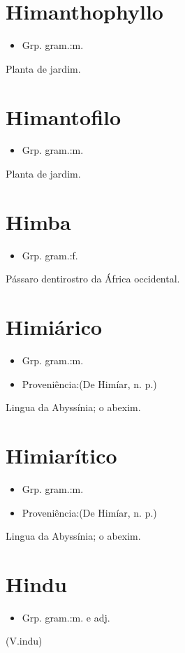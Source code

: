 \documentclass{article}
\begin{document}
\section{Himanthophyllo}
\begin{itemize}
\item {Grp. gram.:m.}
\end{itemize}
Planta de jardim.
\section{Himantofilo}
\begin{itemize}
\item {Grp. gram.:m.}
\end{itemize}
Planta de jardim.
\section{Himba}
\begin{itemize}
\item {Grp. gram.:f.}
\end{itemize}
Pássaro dentirostro da África occidental.
\section{Himiárico}
\begin{itemize}
\item {Grp. gram.:m.}
\end{itemize}
\begin{itemize}
\item {Proveniência:(De \textunderscore Himíar\textunderscore , n. p.)}
\end{itemize}
Lingua da Abyssínia; o abexim.
\section{Himiarítico}
\begin{itemize}
\item {Grp. gram.:m.}
\end{itemize}
\begin{itemize}
\item {Proveniência:(De \textunderscore Himíar\textunderscore , n. p.)}
\end{itemize}
Lingua da Abyssínia; o abexim.
\section{Hindu}
\begin{itemize}
\item {Grp. gram.:m.  e  adj.}
\end{itemize}
(V.indu)
\end{document}
